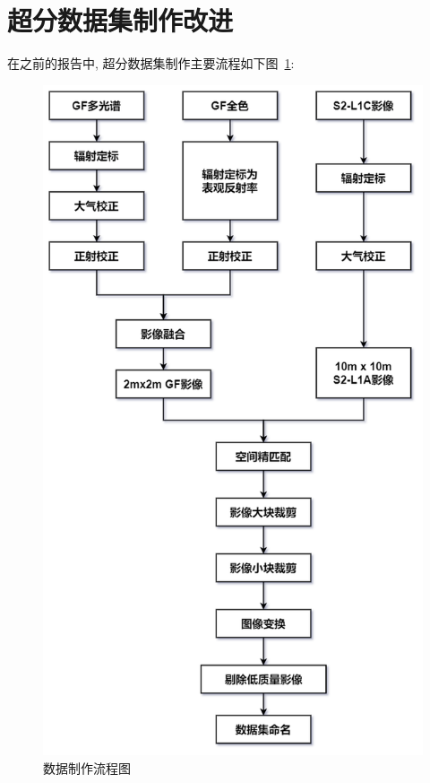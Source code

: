 \section{超分数据集制作改进}

在之前的报告中, 超分数据集制作主要流程如下图~\ref{fig:0201}:
\begin{figure}[!htbp]
    \centering
    \includegraphics[height=0.7\textheight]{pic/pic0201.png}
    \caption{数据制作流程图}
    \label{fig:0201}
\end{figure}

